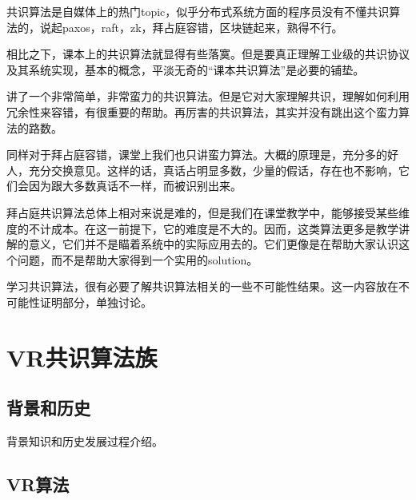 \documentclass[UTF8]{ctexrep}
\begin{document}
共识算法是自媒体上的热门topic，似乎分布式系统方面的程序员没有不懂共识算法的，说起paxos，raft，zk，拜占庭容错，区块链起来，熟得不行。

相比之下，课本上的共识算法就显得有些落寞。但是要真正理解工业级的共识协议及其系统实现，基本的概念，平淡无奇的“课本共识算法”是必要的铺垫。

\cite[Sec 5.1.3]{Attiya04}讲了一个非常简单，非常蛮力的共识算法。但是它对大家理解共识，理解如何利用冗余性来容错，有很重要的帮助。再厉害的共识算法，其实并没有跳出这个蛮力算法的路数。

同样对于拜占庭容错，课堂上我们也只讲蛮力算法\cite[Sec 5.2.4, Sec 5.2.5]{Attiya04}。大概的原理是，充分多的好人，充分交换意见。这样的话，真话占明显多数，少量的假话，存在也不影响，它们会因为跟大多数真话不一样，而被识别出来。

拜占庭共识算法总体上相对来说是难的，但是我们在课堂教学中，能够接受某些维度的不计成本。在这一前提下，它的难度是不大的。因而，这类算法更多是教学讲解的意义，它们并不是瞄着系统中的实际应用去的。它们更像是在帮助大家认识这个问题，而不是帮助大家得到一个实用的solution。

学习共识算法，很有必要了解共识算法相关的一些不可能性结果。这一内容放在不可能性证明部分，单独讨论。








\chapter{VR共识算法族}

\section{背景和历史}

背景知识和历史发展过程介绍\cite[Chap 7]{Charron10}。

\section{VR算法}


\end{document}
